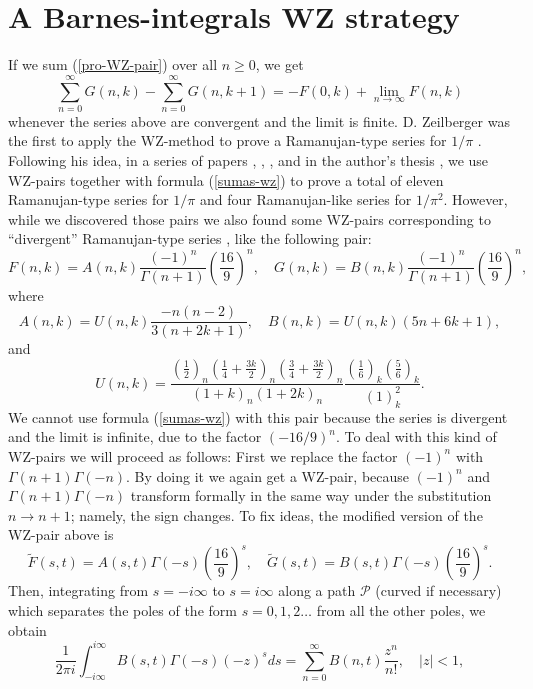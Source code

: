 \documentclass[12pt,a4paper]{amsart}
\begin{document}
\section{A Barnes-integrals WZ strategy}

If we sum (\ref{pro-WZ-pair}) over all $n \geq 0$, we get
\begin{equation}\label{sumas-wz}
\sum_{n=0}^{\infty} G(n,k) - \sum_{n=0}^{\infty} G(n,k+1) = -F(0,k) + \lim_{n \to \infty} F(n,k)
\end{equation}
whenever the series above are convergent and the limit is finite. D. Zeilberger was the first to apply the WZ-method to prove a Ramanujan-type series for $1/\pi$ \cite{ekhad}. Following his idea, in a series of papers \cite{guilleraAAMwz}, \cite{guilleraRJgen}, \cite{guillera-RJonwz}, \cite{guillera-RJnewrama} and in the author's thesis \cite{guilleratesis}, we use WZ-pairs together with formula (\ref{sumas-wz}) to prove a total of eleven Ramanujan-type series for $1/\pi$ and four Ramanujan-like series for $1/\pi^2$. However, while we discovered those pairs we also found some WZ-pairs corresponding to ``divergent'' Ramanujan-type series \cite{gui-zu}, like the following pair:
\[
F(n,k)=A(n,k) \frac{(-1)^n}{\Gamma(n+1)} \left( \frac{16}{9} \right)^n, \quad
G(n,k)= B(n,k) \frac{(-1)^n}{\Gamma(n+1)} \left( \frac{16}{9} \right)^n,
\]
where
\[ A(n,k)=U(n,k)\frac{-n(n-2)}{3(n+2k+1)}, \quad B(n,k)=U(n,k)(5n+6k+1), \]
and
\[
U(n,k)=\frac{\left( \frac{1}{2} \right)_n \left( \frac{1}{4}+\frac{3k}{2} \right)_n \left( \frac{3}{4}+\frac{3k}{2} \right)_n}{(1+k)_n (1+2k)_n}  \frac{\left( \frac{1}{6} \right)_k \left( \frac{5}{6} \right)_k}{(1)_k^2}.
\]
We cannot use formula (\ref{sumas-wz}) with this pair because the series is divergent and the limit is infinite, due to the factor $(-16/9)^n$. To deal with this kind of WZ-pairs we will proceed as follows: First we replace the factor $(-1)^n$ with $\Gamma(n+1)\Gamma(-n)$. By doing it we again get a WZ-pair, because $(-1)^n$ and $\Gamma(n+1)\Gamma(-n)$ transform formally in the same way under the substitution $n \rightarrow n+1$; namely, the sign changes. To fix ideas, the modified version of the WZ-pair above is
\[
\widetilde{F}(s,t)=A(s,t) \Gamma(-s) \left( \frac{16}{9} \right)^s, \quad
\widetilde{G}(s,t)=B(s,t) \Gamma(-s) \left( \frac{16}{9} \right)^s.
\]
Then, integrating from $s=-i\infty$ to $s=i\infty$ along a path $\mathcal{P}$ (curved if necessary) which separates the poles of the form $s=0,1,2 \dots$ from all the other poles, we obtain
\begin{equation}
\frac{1}{2 \pi i} \int_{-i\infty}^{i\infty}B(s,t)\Gamma(-s)(-z)^sds=
\sum_{n=0}^{\infty}B(n,t)\frac{z^n}{n!}, \quad |z|<1,
\end{equation}
\end{document}
